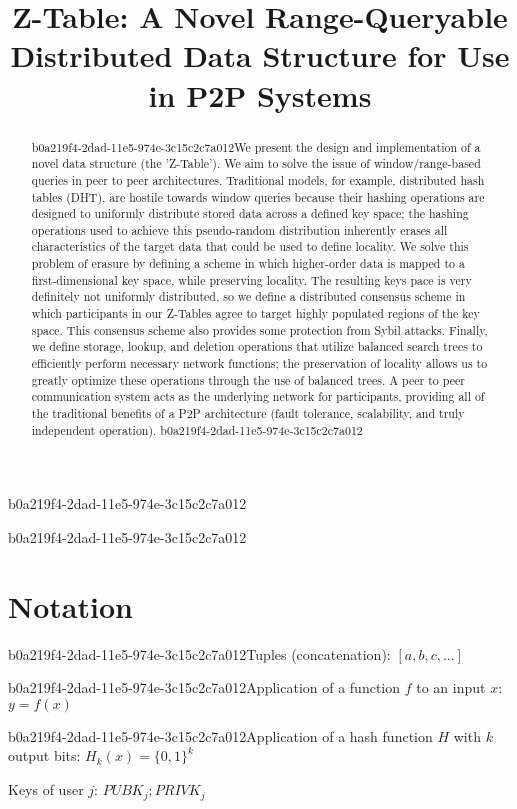 \documentclass[12pt]{article}
\title{Z-Table: A Novel Range-Queryable Distributed Data Structure for Use in P2P Systems}
\begin{document}
b0a219f4-2dad-11e5-974e-3c15c2c7a012\maketitle

\begin{abstract}
b0a219f4-2dad-11e5-974e-3c15c2c7a012We present the design and implementation of a novel data structure (the 'Z-Table'). We aim to solve the issue of window/range-based queries in peer to peer architectures. Traditional models, for example,  distributed hash tables (DHT), are hostile towards window queries because their hashing operations are designed to uniformly distribute stored data across a defined key space; the hashing operations used to achieve this pseudo-random distribution inherently erases all characteristics of the target data that could be used to define locality. We solve this problem of erasure by defining a scheme in which higher-order data is mapped to a first-dimensional key space, while preserving locality. The resulting keys pace is very definitely not uniformly distributed, so we define a distributed consensus scheme in which participants in our Z-Tables agree to target highly populated regions of the key space. This consensus scheme also provides some protection from Sybil attacks. Finally, we define storage, lookup, and deletion operations that utilize balanced search trees to efficiently perform necessary network functions; the preservation of locality allows us to greatly optimize these operations through the use of balanced trees. A peer to peer communication system acts as the underlying network for participants, providing all of the traditional benefits of a P2P architecture (fault tolerance, scalability, and truly independent operation).
b0a219f4-2dad-11e5-974e-3c15c2c7a012\end{abstract}

b0a219f4-2dad-11e5-974e-3c15c2c7a012\section{Notation}

b0a219f4-2dad-11e5-974e-3c15c2c7a012Tuples (concatenation): $[a,b,c,...]$

b0a219f4-2dad-11e5-974e-3c15c2c7a012Application of a function $f$ to an input $x$: $y=f(x)$

b0a219f4-2dad-11e5-974e-3c15c2c7a012Application of a hash function $H$ with $k$ output bits: $H_{k}(x) = \{0,1\}^k$

Keys of user $j$: $ PUBK_j; PRIVK_j $
\end{document}
